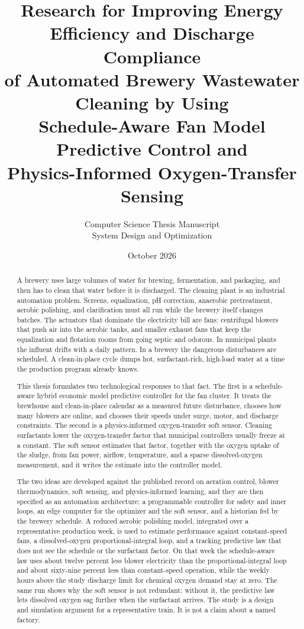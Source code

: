 \documentclass[12pt,a4paper]{report}
\title{%
Research for Improving Energy Efficiency and Discharge Compliance\\
of Automated Brewery Wastewater Cleaning by Using\\
Schedule-Aware Fan Model Predictive Control and\\
Physics-Informed Oxygen-Transfer Sensing}
\author{Computer Science Thesis Manuscript\\[0.4em]
\large System Design and Optimization}
\date{October 2026}
\begin{document}
\maketitle

\begin{abstract}
\noindent
A brewery uses large volumes of water for brewing, fermentation, and packaging, and then has to clean that water before it is discharged. The cleaning plant is an industrial automation problem. Screens, equalization, pH correction, anaerobic pretreatment, aerobic polishing, and clarification must all run while the brewery itself changes batches. The actuators that dominate the electricity bill are fans: centrifugal blowers that push air into the aerobic tanks, and smaller exhaust fans that keep the equalization and flotation rooms from going septic and odorous. In municipal plants the influent drifts with a daily pattern. In a brewery the dangerous disturbances are scheduled. A clean-in-place cycle dumps hot, surfactant-rich, high-load water at a time the production program already knows.

This thesis formulates two technological responses to that fact. The first is a schedule-aware hybrid economic model predictive controller for the fan cluster. It treats the brewhouse and clean-in-place calendar as a measured future disturbance, chooses how many blowers are online, and chooses their speeds under surge, motor, and discharge constraints. The second is a physics-informed oxygen-transfer soft sensor. Cleaning surfactants lower the oxygen-transfer factor that municipal controllers usually freeze at a constant. The soft sensor estimates that factor, together with the oxygen uptake of the sludge, from fan power, airflow, temperature, and a sparse dissolved-oxygen measurement, and it writes the estimate into the controller model.

The two ideas are developed against the published record on aeration control, blower thermodynamics, soft sensing, and physics-informed learning, and they are then specified as an automation architecture: a programmable controller for safety and inner loops, an edge computer for the optimizer and the soft sensor, and a historian fed by the brewery schedule. A reduced aerobic polishing model, integrated over a representative production week, is used to estimate performance against constant-speed fans, a dissolved-oxygen proportional-integral loop, and a tracking predictive law that does not see the schedule or the surfactant factor. On that week the schedule-aware law uses about twelve percent less blower electricity than the proportional-integral loop and about sixty-nine percent less than constant-speed operation, while the weekly hours above the study discharge limit for chemical oxygen demand stay at zero. The same run shows why the soft sensor is not redundant: without it, the predictive law lets dissolved oxygen sag further when the surfactant arrives. The study is a design and simulation argument for a representative train. It is not a claim about a named factory.
\end{abstract}
\end{document}
